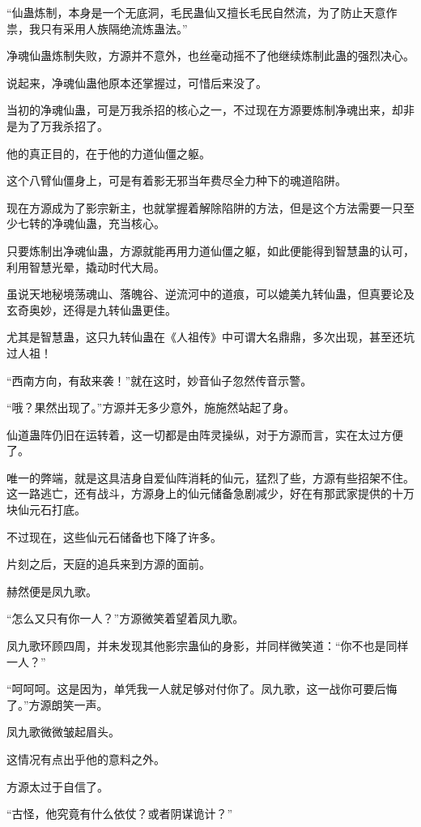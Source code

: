 \begin{this_body}
“仙蛊炼制，本身是一个无底洞，毛民蛊仙又擅长毛民自然流，为了防止天意作祟，我只有采用人族隔绝流炼蛊法。”

净魂仙蛊炼制失败，方源并不意外，也丝毫动摇不了他继续炼制此蛊的强烈决心。

说起来，净魂仙蛊他原本还掌握过，可惜后来没了。

当初的净魂仙蛊，可是万我杀招的核心之一，不过现在方源要炼制净魂出来，却非是为了万我杀招了。

他的真正目的，在于他的力道仙僵之躯。

这个八臂仙僵身上，可是有着影无邪当年费尽全力种下的魂道陷阱。

现在方源成为了影宗新主，也就掌握着解除陷阱的方法，但是这个方法需要一只至少七转的净魂仙蛊，充当核心。

只要炼制出净魂仙蛊，方源就能再用力道仙僵之躯，如此便能得到智慧蛊的认可，利用智慧光晕，撬动时代大局。

虽说天地秘境荡魂山、落魄谷、逆流河中的道痕，可以媲美九转仙蛊，但真要论及玄奇奥妙，还得是九转仙蛊更佳。

尤其是智慧蛊，这只九转仙蛊在《人祖传》中可谓大名鼎鼎，多次出现，甚至还坑过人祖！

“西南方向，有敌来袭！”就在这时，妙音仙子忽然传音示警。

“哦？果然出现了。”方源并无多少意外，施施然站起了身。

仙道蛊阵仍旧在运转着，这一切都是由阵灵操纵，对于方源而言，实在太过方便了。

唯一的弊端，就是这具洁身自爱仙阵消耗的仙元，猛烈了些，方源有些招架不住。这一路逃亡，还有战斗，方源身上的仙元储备急剧减少，好在有那武家提供的十万块仙元石打底。

不过现在，这些仙元石储备也下降了许多。

片刻之后，天庭的追兵来到方源的面前。

赫然便是凤九歌。

“怎么又只有你一人？”方源微笑着望着凤九歌。

凤九歌环顾四周，并未发现其他影宗蛊仙的身影，并同样微笑道：“你不也是同样一人？”

“呵呵呵。这是因为，单凭我一人就足够对付你了。凤九歌，这一战你可要后悔了。”方源朗笑一声。

凤九歌微微皱起眉头。

这情况有点出乎他的意料之外。

方源太过于自信了。

“古怪，他究竟有什么依仗？或者阴谋诡计？”

\end{this_body}

